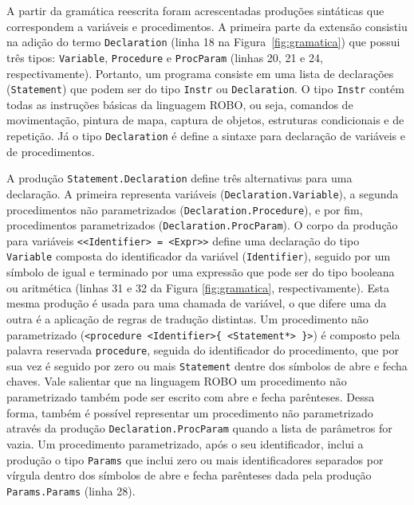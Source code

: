 A partir da gramática reescrita foram acrescentadas produções sintáticas que correspondem a variáveis e procedimentos. A primeira parte da extensão consistiu na adição do termo \texttt{Declaration} (linha 18 na Figura~\ref{fig:gramatica}) que possui três tipos: \texttt{Variable}, \texttt{Procedure} e \texttt{ProcParam} (linhas 20, 21 e 24, respectivamente). Portanto, um programa consiste em uma lista de declarações (\texttt{Statement}) que podem ser do tipo \texttt{Instr} ou \texttt{Declaration}. O tipo \texttt{Instr} contém todas as instruções básicas da linguagem ROBO, ou seja, comandos de movimentação, pintura de mapa, captura de objetos, estruturas condicionais e de repetição.
Já o tipo \texttt{Declaration} é define a sintaxe para declaração de variáveis e de procedimentos. 

 
A produção \texttt{Statement.Declaration} define três alternativas para uma declaração. A primeira representa variáveis (\texttt{Declaration.Variable}), a segunda procedimentos não parametrizados (\texttt{Declaration.Procedure}), e por fim, procedimentos parametrizados (\texttt{Declaration.ProcParam}). O corpo da produção para variáveis \texttt{<<Identifier> = <Expr>>} define uma declaração do tipo \texttt{Variable} composta do identificador da variável (\texttt{Identifier}), seguido por um símbolo de igual e terminado por uma expressão que pode ser do tipo booleana ou aritmética (linhas 31 e 32 da Figura \ref{fig:gramatica}, respectivamente). Esta mesma produção é usada para uma chamada de variável, o que difere uma da outra é a aplicação de regras de tradução distintas. Um procedimento não parametrizado (\texttt{<procedure <Identifier>\{ <Statement*> \}>}) é composto pela palavra reservada \texttt{procedure}, seguida do identificador do procedimento, que por sua vez é seguido por zero ou mais \texttt{Statement} dentre dos símbolos de abre e fecha chaves. Vale salientar que na linguagem ROBO um procedimento não parametrizado também pode ser escrito com abre e fecha parênteses. Dessa forma, também é possível representar um procedimento não parametrizado através da produção \texttt{Declaration.ProcParam} quando a lista de parâmetros for vazia. Um procedimento parametrizado, após o seu identificador, inclui a produção o tipo \texttt{Params} que inclui zero ou mais identificadores separados por vírgula dentro dos símbolos de abre e fecha parênteses dada pela produção \texttt{Params.Params} (linha 28).

